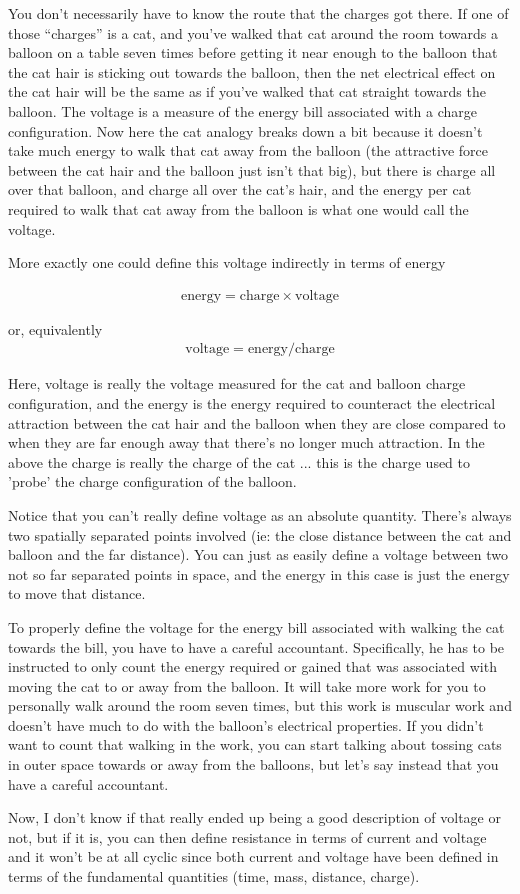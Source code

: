 \documentclass{article}
\begin{document}
You don't necessarily have to know the route that the charges got there.  If one of those ``charges'' is a
cat, and you've walked that cat around the room towards a balloon on a table seven times before getting it near enough 
to the balloon that the cat hair is sticking out towards the balloon, then the net electrical effect on the cat hair will 
be the same as if you've walked that cat straight towards the balloon.  The voltage is a measure of the energy bill associated
with a charge configuration.  Now here the cat analogy breaks down a bit because it doesn't take much energy to walk that cat
away from the balloon (the attractive force between the cat hair and the balloon just isn't that big), but there is charge
all over that balloon, and charge all over the cat's hair, and the energy per cat required to walk that cat away from the balloon
is what one would call the voltage.

More exactly one could define this voltage indirectly in terms of energy

\begin{align*}
\text{energy} = \text{charge} \times \text{voltage}
\end{align*}

or, equivalently
\begin{align*}
\text{voltage} = \text{energy} / \text{charge}
\end{align*}

Here, voltage is really the voltage measured for the cat and balloon charge configuration, and the energy is 
the energy required to counteract the electrical attraction between the cat hair and the balloon when they are close
compared to when they are far enough away that there's no longer much attraction.  In the above the charge is really
the charge of the cat ... this is the charge used to 'probe' the charge configuration of the balloon.

Notice that you can't really define voltage as an absolute quantity.  There's always two spatially separated points 
involved (ie: the close distance between the cat and balloon and the far distance).  You can just as easily define a
voltage between two not so far separated points in space, and the energy in this case is just the energy to move
that distance.

To properly define the voltage for the energy bill associated with walking the cat towards the bill, you have to have
a careful accountant.   Specifically, he has to be instructed to only count the energy required or gained that was
associated with moving the cat to or away from the balloon.  It will take more work for you to personally walk around the
room seven times, but this work is muscular work and doesn't have much to do with the balloon's electrical properties.
If you didn't want to count that walking in the work, you can start talking about tossing cats in outer space towards or 
away from the balloons, but let's say instead that you have a careful accountant.

Now, I don't know if that really ended up being a good description of voltage or not, but if it is, you can then define
resistance in terms of current and voltage and it won't be at all cyclic since both current and voltage have been defined
in terms of the fundamental quantities (time, mass, distance, charge).
\end{document}
